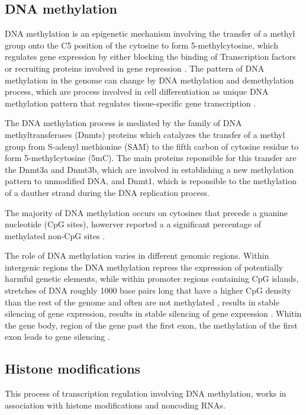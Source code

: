 \subsection{DNA methylation}
DNA methylation is an epigenetic mechanism involving the transfer of a methyl group onto the C5
position of the cytosine to form 5-methylcytosine, which regulates
gene expression  by either blocking the binding of Transcription factors or
recruiting proteins involved in gene repression \cite{moore2013dna}.
The pattern of DNA methylation in the genome can change by DNA methylation and demethylation process,
which  are process involved in cell differentiation as unique DNA methylation pattern that regulates
tissue-specific gene transcription \cite{moore2013dna}.

The DNA methylation process is mediated by the family of DNA methyltransferases (Dnmts)
proteins which catalyzes the transfer of a methyl group from S-adenyl methionine (SAM) to the fifth carbon of cytosine residue to form 5-methylcytosine (5mC).
The main proteins reponsible for this transfer are the Dnmt3a and Dnmt3b, which
are involved in establishing a new methylation pattern to unmodified DNA, and Dnmt1, which is reponsible
to the methylation of a dauther strand during the DNA replication process.

The majority of DNA methylation occurs on cytosines that precede a guanine nucleotide (CpG sites), howerver
 reported a a significant percentage of methylated non-CpG sites \cite{xie2012base}.

The role of DNA methylation varies in different genomic regions.
Within intergenic regions the DNA methylation repress the expression of potentially harmful genetic elements,
while within promoter regions containing CpG islands, stretches of DNA roughly 1000 base pairs long that have a higher CpG density than the rest of the genome and  often  are not methylated  \cite{bird1985fraction}, results in stable silencing of gene expression, results in stable silencing of gene expression \cite{mohn2008lineage}.
Whitin the gene body, region of the gene past the first exon, the methylation of the first exon leads to gene silencing
\cite{brenet2011dna}.


\subsection{Histone modifications}

This process of transcription regulation involving DNA methylation,
works in association with histone modifications and noncoding RNAs.

